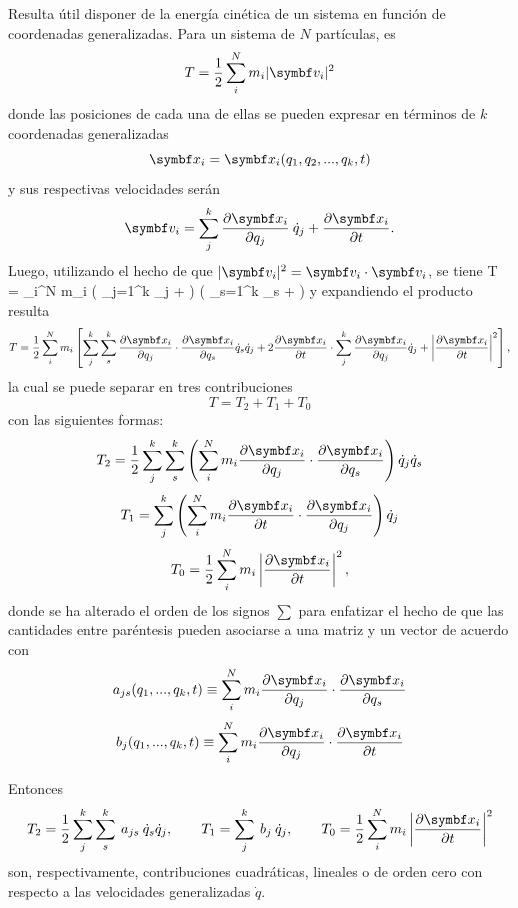 \documentclass[10pt,oneside]{CBFT_book}
\begin{document}
Resulta útil disponer de la energía cinética de un sistema en función de coordenadas generalizadas.
Para un sistema de $N$ partículas, es 
\[
	T = \frac{1}{2} \sum_i^N m_i |\vb{v}_i|^2 
\]
donde las posiciones de cada una de ellas se pueden expresar en términos de $k$ coordenadas generalizadas
\[
	\vb{x}_i = \vb{x}_i(q_1, q_2, ..., q_k, t )
\]
y sus respectivas velocidades serán
\[
	\vb{v}_i = \sum_j^{k}  \dpar{\vb{x}_i}{q_j} \: \dot{q}_j + \dpar{\vb{x}_i}{t}.
\]
Luego, utilizando el hecho de que $ |\vb{v}_i|^2 = \vb{v}_i \cdot \vb{v}_i $, se tiene 
\be
	T =  \sum_i^N m_i \left( \sum_{j=1}^{k}  _j +  \right)
	\cdot \left( \sum_{s=1}^{k} _s +  \right) 
\label{mc_T}
\ee
y expandiendo el producto resulta
\[
	T = \frac{1}{2} \sum_i^N m_i \left[ \sum_j^{k}\sum_s^{k} \dpar{\vb{x}_i}{q_j} \cdot \dpar{\vb{x}_i}{q_s}\dot{q}_s\dot{q}_j + 
	2 \dpar{\vb{x}_i}{t} \cdot \sum_j^{k} \dpar{\vb{x}_i}{q_j}\dot{q}_j + \left| \dpar{\vb{x}_i}{t} \right|^2 \right],
\]
la cual se puede separar en tres contribuciones
\[
	T = T_2 + T_1 + T_0
\]
con las siguientes formas:
\[
	T_2 = \frac{1}{2} \sum_j^{k} \sum_s^{k} \left( \sum_i^N m_i \dpar{\vb{x}_i}{q_j} \cdot \dpar{\vb{x}_i}{q_s} \right) \dot{q}_j\dot{q}_s
\]
\[
	T_1 =  \sum_j^{k} \left( \sum_i^N m_i \dpar{\vb{x}_i}{t} \cdot \dpar{\vb{x}_i}{q_j} \right) \dot{q}_j
\]
\[
	T_0 = \frac{1}{2} \sum_i^N m_i \left| \dpar{\vb{x}_i}{t} \right|^2,
\]
donde se ha alterado el orden de los signos $\sum$ para enfatizar el hecho de que las cantidades entre paréntesis pueden asociarse
a una matriz y un vector de acuerdo con 
\[
	a_{js}(q_1,...,q_k,t) \equiv \sum_i^N  m_i \dpar{\vb{x}_i}{q_j} \cdot \dpar{\vb{x}_i}{q_s}
\]
\[
	b_j(q_1,...,q_k,t) \equiv \sum_i^N  m_i \dpar{\vb{x}_i}{q_j} \cdot \dpar{\vb{x}_i}{t}
\]

Entonces
\[
	T_2 = \frac{1}{2} \sum_j^{k} \sum_s^{k} \: a_{js} \: \dot{q}_s\dot{q}_j, \qquad 
	T_1 = \sum_j^{k} \: b_j \: \dot{q}_j , \qquad 
	T_0 = \frac{1}{2} \sum_i^N m_i \left| \dpar{\vb{x}_i}{t} \right|^2
\]
son, respectivamente, contribuciones cuadráticas, lineales o de orden cero con respecto a las velocidades generalizadas $\dot{q}$.
% 
\end{document}
